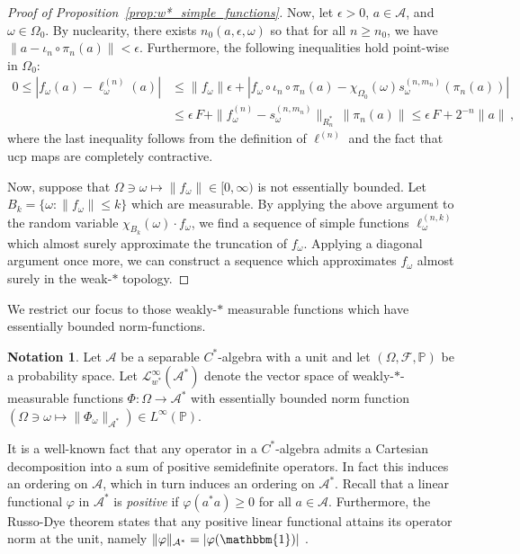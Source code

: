 \documentclass{article}
\newcommand{\one}{\mathbbm{1}}
\newcommand{\A}{\mathcal{A}}
\renewcommand{\P}{\mathbb{P}}
\newcommand{\<}{\langle}
\renewcommand{\>}{\rangle}
\theoremstyle{definition}
\newtheorem{note}[thm]{Notation}
\numberwithin{equation}{section}
\begin{document}
\begin{proof}[Proof of Proposition~\ref{prop:w*_simple_functions}]
    Now, let $\epsilon>0$,  $a\in \A$, and $\omega \in \Omega_0$. By nuclearity, there exists $n_0(a,\epsilon, \omega)$ so that for all $n\ge n_0$, we have $\|a - \iota_n \circ \pi_n (a)\| < \epsilon$. Furthermore, the following inequalities hold point-wise in $\Omega_0$:
    \begin{align*}
        0\le |f_\omega(a) - \ell^{(n)}_\omega(a)| 
                &\le \|f_\omega\| \epsilon + |f_\omega \circ \iota_n \circ \pi_n (a) - \chi_{\Omega_0}(\omega) s^{(n,m_n)}_\omega(\pi_n(a))|\\
        &\le \epsilon\, F + \|f^{(n)}_\omega - s^{(n,m_n)}_\omega \|_{R_n^*}\, \|\pi_n(a)\|\le \epsilon\, F + 2^{-n}\|a\|\,,
    \end{align*} where the last inequality follows from the definition of $\ell^{(n)}$ and the fact that ucp maps are completely contractive. 

    Now, suppose that $\Omega \ni \omega \mapsto \|f_\omega\|\in [0, \infty)$ is not essentially bounded. Let $B_k = \{ \omega \colon \|f_\omega\|\le k\}$ which are measurable. By applying the above argument to the random variable $\chi_{B_k}(\omega) \cdot f_\omega$, we find a sequence of simple functions $\ell^{(n,k)}_\omega$ which almost surely approximate the truncation of $f_\omega$. Applying a diagonal argument once more, we can construct a sequence which approximates $f_\omega$ almost surely in the weak-$\ast$ topology. 
\end{proof}

We restrict our focus to those weakly-$\ast$ measurable functions which have essentially bounded norm-functions.
\begin{note}
	Let $\A$ be a separable $C^*$-algebra with a unit and let $(\Omega, \mathcal{F}, \P)$ be a probability space. Let $\mathcal{L}^\infty _{w^*}(\A^*)$ denote the vector space of weakly-$\ast$-measurable functions $\Phi:\Omega \to \A^*$ with essentially bounded norm function $(\Omega \ni \omega \mapsto \|\Phi_\omega\|_{\A^*}) \in L^{\infty}(\P)$. 
\end{note}


It is a well-known fact that any operator in a $C^*$-algebra admits a Cartesian decomposition into a sum of positive semidefinite operators. In fact this induces an ordering on $\A$, which in turn induces an ordering on $\A^*$. Recall that a linear functional $\varphi$ in $\A^*$ is \emph{positive} if $\varphi(a^*a) \ge 0$ for all $a\in \A$. Furthermore, the Russo-Dye theorem states that any positive linear functional attains its operator norm at the unit, namely $\|\varphi\|_{\A^*} = |\varphi(\one)|$ \cite[Proposition 3.6]{Paulsen}. 
\end{document}
